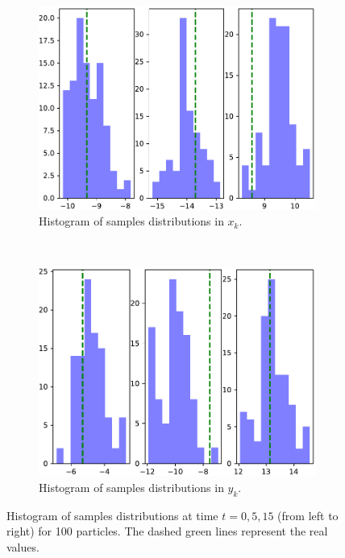 \documentclass[english, DIV=13]{scrartcl}
\begin{document}
\begin{figure}
    \centering
    \begin{subfigure}{0.49\textwidth}
        \includegraphics[width=\textwidth]{figures/hist-x-100}
        \caption{Histogram of samples distributions in $x_k$.}
        \label{fig:q3-hist-x-100}
    \end{subfigure}%
    ~
    \begin{subfigure}{0.49\textwidth}
        \includegraphics[width=\textwidth]{figures/hist-y-100}
        \caption{Histogram of samples distributions in $y_k$.}
        \label{fig:q3-hist-y-100}
    \end{subfigure}
    \caption{Histogram of samples distributions  at time $t = 0, 5, 15$
    (from left to right) for 100 particles. The dashed green lines represent the real
    values.}
    \label{fig:q3-hist}
\end{figure}
\end{document}
